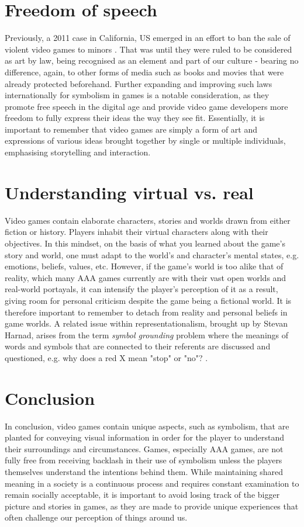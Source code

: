 \documentclass{scrartcl}
\begin{document}
\section{Freedom of speech}
Previously, a 2011 case in California, US emerged in an effort to ban the sale of violent video games to minors \cite{brownv}. That was until they were ruled to be considered as art by law, being recognised as an element and part of our culture - bearing no difference, again, to other forms of media such as books and movies that were already protected beforehand. Further expanding and improving such laws internationally for symbolism in games is a notable consideration, as they promote free speech in the digital age and provide video game developers more freedom to fully express their ideas the way they see fit. Essentially, it is important to remember that video games are simply a form of art and expressions of various ideas brought together by single or multiple individuals, emphasising storytelling and interaction.


\section{Understanding virtual vs. real}
Video games contain elaborate characters, stories and worlds drawn from either fiction or history. Players inhabit their virtual characters along with their objectives. In this mindset, on the basis of what you learned about the game's story and world, one must adapt to the world's and character's mental states, e.g. emotions, beliefs, values, etc. However, if the game's world is too alike that of reality, which many AAA games currently are with their vast open worlds and real-world portayals, it can intensify the player's perception of it as a result, giving room for personal criticism despite the game being a fictional world. It is therefore important to remember to detach from reality and personal beliefs in game worlds. A related issue within representationalism, brought up by Stevan Harnad, arises from the term \textit{symbol grounding} problem where the meanings of words and symbols that are connected to their referents are discussed and questioned, e.g. why does a red X mean "stop" or "no"? \cite{harnad} \cite{davidmyers}.


\section{Conclusion}
In conclusion, video games contain unique aspects, such as symbolism, that are planted for conveying visual information in order for the player to understand their surroundings and circumstances. Games, especially AAA games, are not fully free from receiving backlash in their use of symbolism unless the players themselves understand the intentions behind them. While maintaining shared meaning in a society is a continuous process and requires constant examination to remain socially acceptable, it is important to avoid losing track of the bigger picture and stories in games, as they are made to provide unique experiences that often challenge our perception of things around us. 





\end{document}
